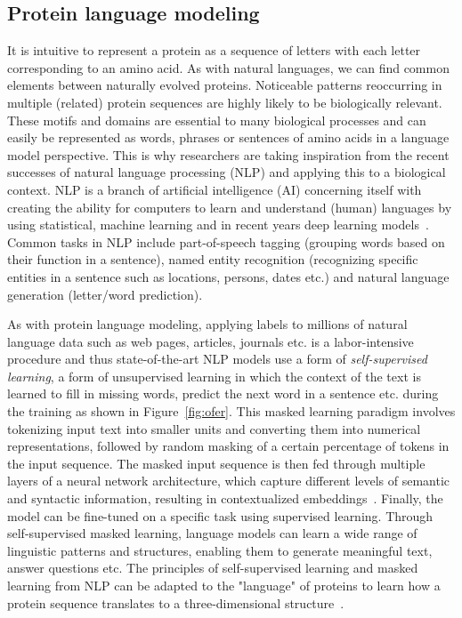 \subsection*{Protein language modeling}\label{ssec:nlp}
It is intuitive to represent a protein as a sequence of letters with each letter corresponding to an amino acid. As with natural languages, we can find common elements between naturally evolved proteins. Noticeable patterns reoccurring in multiple (related) protein sequences are highly likely to be biologically relevant. These motifs and domains are essential to many biological processes and can easily be represented as words, phrases or sentences of amino acids in a language model perspective. This is why researchers are taking inspiration from the recent successes of natural language processing (NLP) and applying this to a biological context. NLP is a branch of artificial intelligence (AI) concerning itself with creating the ability for computers to learn and understand (human) languages by using statistical, machine learning and in recent years deep learning models~\cite{Ofer}. Common tasks in NLP include part-of-speech tagging (grouping words based on their function in a sentence), named entity recognition (recognizing specific entities in a sentence such as locations, persons, dates etc.) and natural language generation (letter/word prediction).

As with protein language modeling, applying labels to millions of natural language data such as web pages, articles, journals etc. is a labor-intensive procedure and thus state-of-the-art NLP models use a form of \textit{self-supervised learning}, a form of unsupervised learning in which the context of the text is learned to fill in missing words, predict the next word in a sentence etc. during the training as shown in Figure~\ref{fig:ofer}. This masked learning paradigm involves tokenizing input text into smaller units and converting them into numerical representations, followed by random masking of a certain percentage of tokens in the input sequence. The masked input sequence is then fed through multiple layers of a neural network architecture, which capture different levels of semantic and syntactic information, resulting in contextualized embeddings~\cite{esm}. Finally, the model can be fine-tuned on a specific task using supervised learning. Through self-supervised masked learning, language models can learn a wide range of linguistic patterns and structures, enabling them to generate meaningful text, answer questions etc. The principles of self-supervised learning and masked learning from NLP can be adapted to the "language" of proteins to learn how a protein sequence translates to a three-dimensional structure~\cite{review}.

